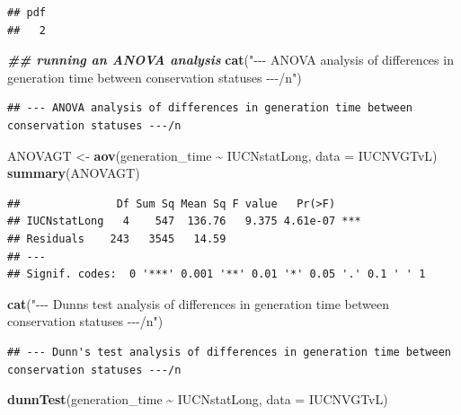 \documentclass[
]{article}
\newenvironment{Shaded}{\begin{snugshade}}{\end{snugshade}}
\newcommand{\AttributeTok}[1]{\textcolor[rgb]{0.13,0.29,0.53}{#1}}
\newcommand{\DocumentationTok}[1]{\textcolor[rgb]{0.56,0.35,0.01}{\textbf{\textit{#1}}}}
\newcommand{\FunctionTok}[1]{\textcolor[rgb]{0.13,0.29,0.53}{\textbf{#1}}}
\newcommand{\NormalTok}[1]{#1}
\newcommand{\OtherTok}[1]{\textcolor[rgb]{0.56,0.35,0.01}{#1}}
\newcommand{\SpecialCharTok}[1]{\textcolor[rgb]{0.81,0.36,0.00}{\textbf{#1}}}
\newcommand{\StringTok}[1]{\textcolor[rgb]{0.31,0.60,0.02}{#1}}
\begin{document}
\begin{verbatim}
## pdf 
##   2
\end{verbatim}

\begin{Shaded}
\begin{Highlighting}[]
\DocumentationTok{\#\# running an ANOVA analysis}
\FunctionTok{cat}\NormalTok{(}\StringTok{"{-}{-}{-} ANOVA analysis of differences in generation time between conservation statuses {-}{-}{-}/n"}\NormalTok{)}
\end{Highlighting}
\end{Shaded}

\begin{verbatim}
## --- ANOVA analysis of differences in generation time between conservation statuses ---/n
\end{verbatim}

\begin{Shaded}
\begin{Highlighting}[]
\NormalTok{ANOVAGT }\OtherTok{\textless{}{-}} \FunctionTok{aov}\NormalTok{(generation\_time }\SpecialCharTok{\textasciitilde{}}\NormalTok{ IUCNstatLong, }\AttributeTok{data =}\NormalTok{ IUCNVGTvL)}
\FunctionTok{summary}\NormalTok{(ANOVAGT)}
\end{Highlighting}
\end{Shaded}

\begin{verbatim}
##               Df Sum Sq Mean Sq F value   Pr(>F)    
## IUCNstatLong   4    547  136.76   9.375 4.61e-07 ***
## Residuals    243   3545   14.59                     
## ---
## Signif. codes:  0 '***' 0.001 '**' 0.01 '*' 0.05 '.' 0.1 ' ' 1
\end{verbatim}

\begin{Shaded}
\begin{Highlighting}[]
\FunctionTok{cat}\NormalTok{(}\StringTok{"{-}{-}{-} Dunn\textquotesingle{}s test analysis of differences in generation time between conservation statuses {-}{-}{-}/n"}\NormalTok{)}
\end{Highlighting}
\end{Shaded}

\begin{verbatim}
## --- Dunn's test analysis of differences in generation time between conservation statuses ---/n
\end{verbatim}

\begin{Shaded}
\begin{Highlighting}[]
\FunctionTok{dunnTest}\NormalTok{(generation\_time }\SpecialCharTok{\textasciitilde{}}\NormalTok{ IUCNstatLong, }\AttributeTok{data =}\NormalTok{ IUCNVGTvL)}
\end{Highlighting}
\end{Shaded}
\end{document}
